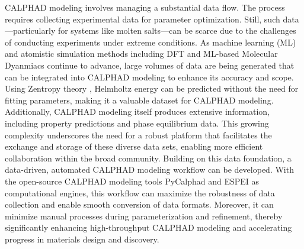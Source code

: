 CALPHAD modeling involves managing a substantial data flow. The process requires collecting experimental data for parameter optimization. Still, such data—particularly for systems like molten salts—can be scarce due to the challenges of conducting experiments under extreme conditions. As machine learning (ML) and atomistic simulation methods including DFT and ML-based Molecular Dyanmiacs continue to advance, large volumes of data are being generated that can be integrated into CALPHAD modeling to enhance its accuracy and scope. Using Zentropy theory \cite{liu2022zentropy, liu2024zentropy}, Helmholtz energy can be predicted without the need for fitting parameters, making it a valuable dataset for CALPHAD modeling. Additionally, CALPHAD modeling itself produces extensive information, including property predictions and phase equilibrium data. This growing complexity underscores the need for a robust platform that facilitates the exchange and storage of these diverse data sets, enabling more efficient collaboration within the broad community. Building on this data foundation, a data-driven, automated CALPHAD modeling workflow can be developed. With the open-source CALPHAD modeling tools PyCalphad and ESPEI as computational engines, this workflow can maximize the robustness of data collection and enable smooth conversion of data formats. Moreover, it can minimize manual processes during parameterization and refinement, thereby significantly enhancing high-throughput CALPHAD modeling and accelerating progress in materials design and discovery. 

